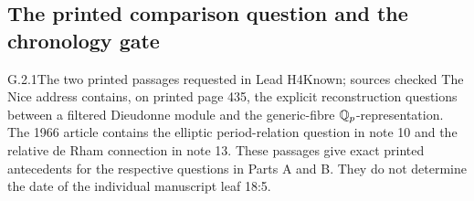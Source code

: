 \subsection{The printed comparison question and the chronology gate}

\begin{result}{G.2.1}{The two printed passages requested in Lead H4}{Known; sources checked}
The Nice address contains, on printed page 435, the explicit reconstruction questions between a filtered Dieudonne module and the generic-fibre $\mathbb Q_p$-representation. The 1966 article contains the elliptic period-relation question in note 10 and the relative de Rham connection in note 13. These passages give exact printed antecedents for the respective questions in Parts A and B. They do not determine the date of the individual manuscript leaf 18:5.
\end{result}
